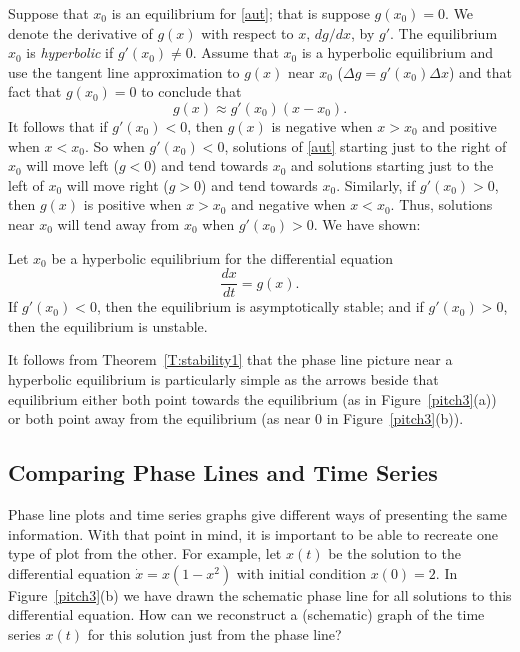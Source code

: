 \documentclass{ximera}
\begin{document}
Suppose that $x_0$ is an equilibrium for \eqref{aut}; that is suppose
$g(x_0)=0$.  We denote the derivative of $g(x)$ with respect to $x$, 
$dg/dx$, by $g'$.  The equilibrium $x_0$ is 
{\em hyperbolic\/} 
if $g'(x_0)\neq 0$.  Assume that $x_0$ is a hyperbolic equilibrium and use
the tangent line approximation to $g(x)$ near $x_0$
($\Delta g = g'(x_0)\Delta x$) and that fact that $g(x_0)=0$ to conclude that
\[
g(x) \approx g'(x_0)(x-x_0).
\]
It follows that if $g'(x_0)<0$, then $g(x)$ is negative when
$x>x_0$ and positive when $x<x_0$.  So when $g'(x_0)<0$,
solutions of \eqref{aut} starting just to the right of $x_0$ will
move left ($g<0$) and tend towards $x_0$ and solutions starting
just to the left of $x_0$ will move right ($g>0$) and tend
towards $x_0$.  Similarly, if $g'(x_0)>0$, then $g(x)$ is positive
when $x>x_0$ and negative when $x<x_0$.  Thus, solutions near $x_0$ 
will tend away from $x_0$ when $g'(x_0)>0$.    We  have shown:
\begin{theorem} \label{T:stability1}
Let $x_0$ be a hyperbolic equilibrium for the differential equation
\[
\frac{dx}{dt} = g(x).
\]
If $g'(x_0)<0$, then the equilibrium is asymptotically stable;
and if $g'(x_0)>0$, then the equilibrium is unstable.
\end{theorem}  

It follows from Theorem~\ref{T:stability1} that the phase line picture
near a hyperbolic equilibrium is particularly simple as the arrows beside
that equilibrium either both point towards the equilibrium (as in
Figure~\ref{pitch3}(a)) or both point away from the equilibrium (as near $0$
in Figure~\ref{pitch3}(b)).

\subsection*{Comparing Phase Lines and Time Series}

Phase line plots and time series graphs give different ways of
presenting the same information.  With that point in mind, it is
important to be able to recreate one type of plot from
the other.  For example, let $x(t)$ be the solution to the
differential equation $\dot{x}=x(1-x^2)$ with initial condition $x(0)=2$.
In Figure~\ref{pitch3}(b) we have drawn the schematic phase line for
all solutions to this differential equation. How can we reconstruct
a (schematic) graph of the time series $x(t)$ for this solution just
from the phase line?
\end{document}
